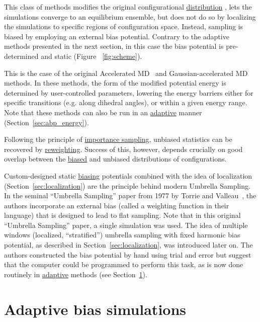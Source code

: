 \documentclass[9pt,review]{livecoms}
\begin{document}
This class of methods modifies the original configurational \hyperlink{ref:Distribution} {distribution} , lets the simulations converge to an equilibrium ensemble, but does not do so by localizing the simulations to specific regions of configuration space. Instead, sampling is biased by employing an external bias potential. Contrary to the adaptive methods presented in the next section, in this case the bias potential is pre-determined and static (Figure ~\ref{fig:scheme}).

This is the case of the original Accelerated MD~\cite{Hamelberg2004} and Gaussian-accelerated MD~\cite{Miao2017, Wang2021} methods. In these methods, the form of the modified potential energy is determined by user-controlled parameters, lowering the energy barriers either for specific transitions (e.g. along dihedral angles), or within a given energy range. Note that these methods can also be run in an \hyperlink{ref:Adaptive} {adaptive} manner (Section~\ref{sec:abp_energy}).

Following the principle of \hyperlink{ref:IS} {importance sampling}, unbiased statistics can be recovered by \hyperlink{ref:Reweighting} {reweighting}.
Success of this, however, depends crucially on good overlap between the \hyperlink{ref:BiasedDist} {biased} and unbiased distributions of configurations.

Custom-designed static \hyperlink{ref:biasingE} {biasing} potentials combined with the idea of localization (Section~\ref{sec:localization}) are the principle behind modern Umbrella Sampling. In the seminal ``Umbrella Sampling'' paper from 1977 by Torrie and Valleau~\cite{TORRIE1977187}, the authors incorporate an external bias (called a weighting function in their language) that is designed to lead to flat sampling. Note that in this original ``Umbrella Sampling'' paper, a single simulation was used. The idea of multiple windows (localized, ``stratified'') umbrella sampling with fixed harmonic bias potential, as described in Section~\ref{sec:localization}, was introduced later on. The authors constructed the bias potential by hand using trial and error but suggest that the computer could be programmed to perform this task, as is now done routinely in \hyperlink{ref:Adaptive} {adaptive} methods (see Section~\ref{sec:AdaptiveBiasSimulations}).


\section{Adaptive bias simulations}
\label{sec:AdaptiveBiasSimulations}
\end{document}
